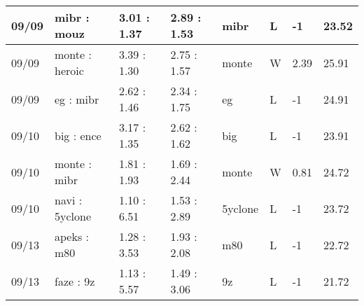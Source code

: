 \begin{small}
\begin{longtable}{|l|l|l|l|l|l|l|l|}
	09/09                               & mibr : mouz                         & 3.01 : 1.37                             & 2.89 : 1.53                             & mibr                              & L                                 & -1                                   & 23.52                             \\ \hline
	09/09                               & monte : heroic                      & 3.39 : 1.30                             & 2.75 : 1.57                             & monte                             & W                                 & 2.39                                 & 25.91                             \\ \hline
	09/09                               & eg : mibr                           & 2.62 : 1.46                             & 2.34 : 1.75                             & eg                                & L                                 & -1                                   & 24.91                             \\ \hline
	09/10                               & big : ence                          & 3.17 : 1.35                             & 2.62 : 1.62                             & big                               & L                                 & -1                                   & 23.91                             \\ \hline
	09/10                               & monte : mibr                        & 1.81 : 1.93                             & 1.69 : 2.44                             & monte                             & W                                 & 0.81                                 & 24.72                             \\ \hline
	09/10                               & navi : 5yclone                      & 1.10 : 6.51                             & 1.53 : 2.89                             & 5yclone                           & L                                 & -1                                   & 23.72                             \\ \hline
	09/13                               & apeks : m80                         & 1.28 : 3.53                             & 1.93 : 2.08                             & m80                               & L                                 & -1                                   & 22.72                             \\ \hline
	09/13                               & faze : 9z                           & 1.13 : 5.57                             & 1.49 : 3.06                             & 9z                                & L                                 & -1                                   & 21.72                             \\ \hline

\end{longtable}
\end{small}
